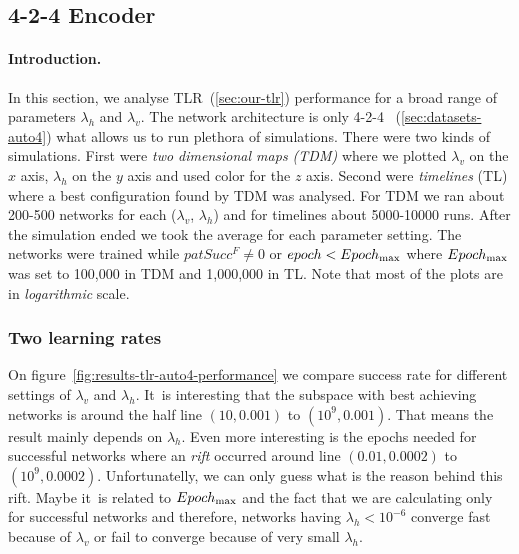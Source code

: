 

\subsection{4-2-4 Encoder} 
\label{sec:results-auto4} 

\paragraph{Introduction.} 
\label{sec:results-auto4-introduction} 
In this section, we analyse TLR~(\ref{sec:our-tlr}) performance for a broad range of parameters $\lambda_h$ and $\lambda_v$. The network architecture is only 4-2-4~
(\ref{sec:datasets-auto4}) what allows us to run plethora of simulations. There were two kinds of simulations. First were \emph{two dimensional maps (TDM)} where we plotted $\lambda_v$ on the $x$ axis, $\lambda_h$ on the $y$ axis and used color for the $z$ axis. Second were \emph{timelines} (TL) where a best configuration found by TDM was analysed. For TDM we ran about 200-500 networks for each ($\lambda_v$, $\lambda_h$) and for timelines about 5000-10000 runs. After the simulation ended we took the average for each parameter setting. The networks were trained while $patSucc^F \neq 0$ or $epoch < Epoch_{\rm max}$ where $Epoch_{\rm max}$ was set to 100,000 in TDM and 1,000,000 in TL. Note that most of the plots are in \emph{logarithmic} scale. 

 

\subsubsection{Two learning rates} 
\label{sec:tlr-auto4}

On figure~\ref{fig:results-tlr-auto4-performance} we compare success rate for different settings of $\lambda_v$ and $\lambda_h$. It~is interesting that the subspace with best achieving networks is around the half line $(10, 0.001)$ to $(10^9, 0.001)$. That means the result mainly depends on $\lambda_h$. Even more interesting is the epochs needed for successful networks where an \emph{rift} occurred around line $(0.01, 0.0002)$ to $(10^9, 0.0002)$. Unfortunatelly, we can only guess what is the reason behind this rift. Maybe it~is related to $Epoch_{\rm max}$ and the fact that we are calculating only for successful networks and therefore, networks having $\lambda_h < 10^{-6}$ converge fast because of $\lambda_v$ or fail to converge because of very small $\lambda_h$. 


